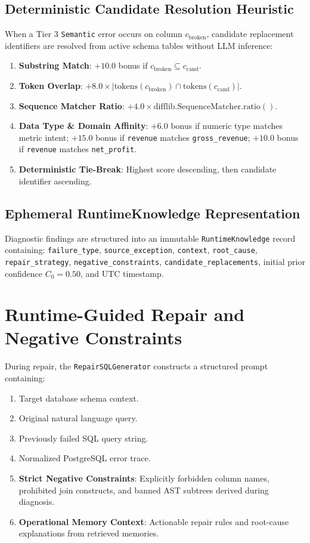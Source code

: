\subsection{Deterministic Candidate Resolution Heuristic}
When a Tier 3 \texttt{Semantic} error occurs on column $c_{\text{broken}}$, candidate replacement identifiers are resolved from active schema tables without LLM inference:
\begin{enumerate}
    \item \textbf{Substring Match}: $+10.0$ bonus if $c_{\text{broken}} \subseteq c_{\text{cand}}$.
    \item \textbf{Token Overlap}: $+8.0 \times |\text{tokens}(c_{\text{broken}}) \cap \text{tokens}(c_{\text{cand}})|$.
    \item \textbf{Sequence Matcher Ratio}: $+4.0 \times \text{difflib.SequenceMatcher.ratio}()$.
    \item \textbf{Data Type \& Domain Affinity}: $+6.0$ bonus if numeric type matches metric intent; $+15.0$ bonus if \texttt{revenue} matches \texttt{gross\_revenue}; $+10.0$ bonus if \texttt{revenue} matches \texttt{net\_profit}.
    \item \textbf{Deterministic Tie-Break}: Highest score descending, then candidate identifier ascending.
\end{enumerate}

\subsection{Ephemeral RuntimeKnowledge Representation}
Diagnostic findings are structured into an immutable \texttt{Runtime\-Knowledge} record containing: \texttt{failure\_\allowbreak type}, \allowbreak\texttt{source\_\allowbreak exception}, \allowbreak\texttt{context}, \allowbreak\texttt{root\_\allowbreak cause}, \allowbreak\texttt{repair\_\allowbreak strategy}, \allowbreak\texttt{negative\_\allowbreak constraints}, \allowbreak\texttt{candidate\_\allowbreak replacements}, initial prior confidence $C_0 = 0.50$, and UTC timestamp.

\section{Runtime-Guided Repair and Negative Constraints}
During repair, the \texttt{RepairSQLGenerator} constructs a structured prompt containing:
\begin{enumerate}
    \item Target database schema context.
    \item Original natural language query.
    \item Previously failed SQL query string.
    \item Normalized PostgreSQL error trace.
    \item \textbf{Strict Negative Constraints}: Explicitly forbidden column names, prohibited join constructs, and banned AST subtrees derived during diagnosis.
    \item \textbf{Operational Memory Context}: Actionable repair rules and root-cause explanations from retrieved memories.
\end{enumerate}

